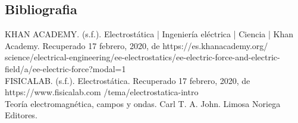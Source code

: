 \documentclass[11pt]{article}
\begin{document}
\begin{multicols}{2}
\section{Bibliografia}

KHAN ACADEMY. (s.f.). Electrostática | Ingeniería eléctrica | Ciencia | Khan Academy. Recuperado 17 febrero, 2020, de https://es.khanacademy.org/ science/electrical-engineering/ee-electrostatics/ee-electric-force-and-electric-field/a/ee-electric-force?modal=1\\

FISICALAB. (s.f.). Electrostática. Recuperado 17 febrero, 2020, de https://www.fisicalab.com /tema/electrostatica-intro\\

Teoría electromagnética, campos y ondas. Carl T. A. John. Limosa Noriega Editores.\\

	\end{multicols}
\end{document}
